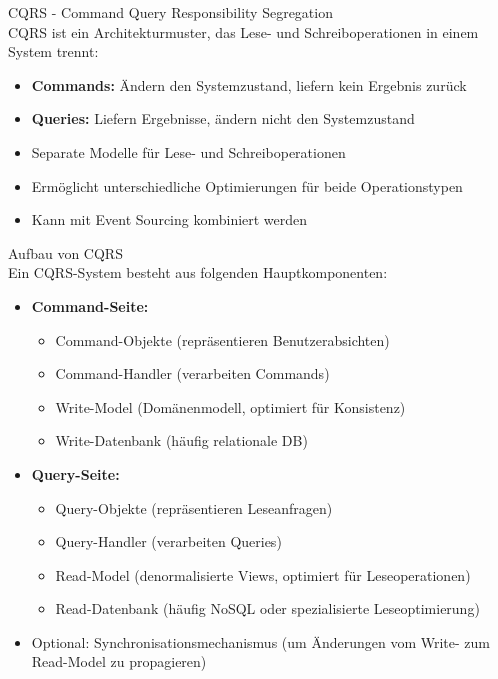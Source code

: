 \begin{definition}{CQRS - Command Query Responsibility Segregation}\\
    CQRS ist ein Architekturmuster, das Lese- und Schreiboperationen in einem System trennt:
    \begin{itemize}
        \item \textbf{Commands:} Ändern den Systemzustand, liefern kein Ergebnis zurück
        \item \textbf{Queries:} Liefern Ergebnisse, ändern nicht den Systemzustand
        \item Separate Modelle für Lese- und Schreiboperationen
        \item Ermöglicht unterschiedliche Optimierungen für beide Operationstypen
        \item Kann mit Event Sourcing kombiniert werden
    \end{itemize}
\end{definition}

\begin{concept}{Aufbau von CQRS}\\
    Ein CQRS-System besteht aus folgenden Hauptkomponenten:
    \begin{itemize}
        \item \textbf{Command-Seite:} 
        \begin{itemize}
            \item Command-Objekte (repräsentieren Benutzerabsichten)
            \item Command-Handler (verarbeiten Commands)
            \item Write-Model (Domänenmodell, optimiert für Konsistenz)
            \item Write-Datenbank (häufig relationale DB)
        \end{itemize}
        
        \item \textbf{Query-Seite:} 
        \begin{itemize}
            \item Query-Objekte (repräsentieren Leseanfragen)
            \item Query-Handler (verarbeiten Queries)
            \item Read-Model (denormalisierte Views, optimiert für Leseoperationen)
            \item Read-Datenbank (häufig NoSQL oder spezialisierte Leseoptimierung)
        \end{itemize}
        
        \item Optional: Synchronisationsmechanismus (um Änderungen vom Write- zum Read-Model zu propagieren)
    \end{itemize}
\end{concept}

